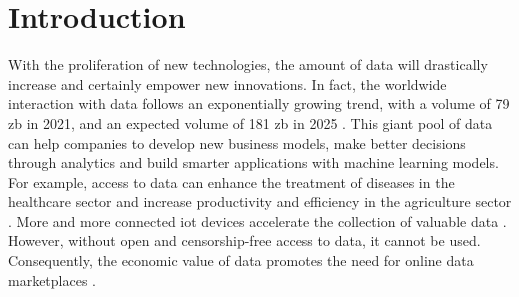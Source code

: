 \chapter{Introduction}
\label{cha:introduction}

With the proliferation of new technologies, the amount of data will drastically increase and certainly empower new innovations. In fact, the worldwide interaction with data follows an exponentially growing trend, with a volume of 79 \acrfull{zb} in 2021, and an expected volume of 181 \acrshort{zb} in 2025 \cite{statistaDataWorldWide}. This giant pool of data can help companies to develop new business models, make better decisions through analytics and build smarter applications with machine learning models. For example, access to data can enhance the treatment of diseases in the healthcare sector \cite{koutsosAgoraPrivacyAwareData,wangBigDataAnalytics2018,suBDTFBlockchainBasedData2020} and increase productivity and efficiency in the agriculture sector \cite{elijahOverviewInternetThings2018}. More and more connected \acrfull{iot} devices accelerate the collection of valuable data \cite{ozyilmazIDMoBIoTData2018,lawrenzBlockchainTechnologyApproach2019}. However, without open and censorship-free access to data, it cannot be used. Consequently, the economic value of data promotes the need for online data marketplaces \cite{dagevilleSnowflakeElasticData2016,krishnamachariI3IoTMarketplace2018}.


